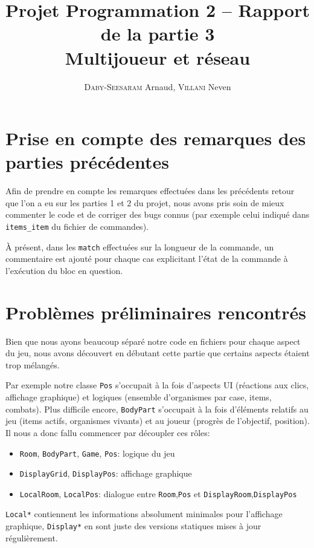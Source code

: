 \documentclass[a4paper,french]{article}
\title{Projet Programmation 2 -- Rapport de la partie 3\\Multijoueur et réseau}
\author{\textsc{Daby-Seesaram} Arnaud, \textsc{Villani} Neven}
\date{}
\newcommand{\ttt}[1]{\texttt{#1}}
\begin{document}
\maketitle

\section{Prise en compte des remarques des parties précédentes}

Afin de prendre en compte les remarques effectuées dans les précédents retour
que l'on a eu sur les parties 1 et 2 du projet, nous avons pris soin de mieux
commenter le code et de corriger des bugs connus (par exemple celui indiqué dans
\texttt{items\_item} du fichier de commandes).

À présent, dans les \texttt{match} effectuées sur la longueur de la commande, un
commentaire est ajouté pour chaque cas explicitant l'état de la commande à
l'exécution du bloc en question.


\section{Problèmes préliminaires rencontrés}

Bien que nous ayons beaucoup séparé notre code en fichiers pour chaque aspect du jeu,
nous avons découvert en débutant cette partie que certains aspects étaient trop
mélangés.

Par exemple notre classe \ttt{Pos} s'occupait à la fois d'aspects UI (réactions aux
clics, affichage graphique) et logiques (ensemble d'organismes par case, items, combats).
Plus difficile encore, \ttt{BodyPart} s'occupait à la fois d'éléments relatifs au
jeu (items actifs, organismes vivants) et au joueur (progrès de l'objectif, position).\\

Il nous a donc fallu commencer par découpler ces rôles:
\begin{itemize}
    \item \ttt{Room}, \ttt{BodyPart}, \ttt{Game}, \ttt{Pos}: logique du jeu
    \item \ttt{DisplayGrid}, \ttt{DisplayPos}: affichage graphique
    \item \ttt{LocalRoom}, \ttt{LocalPos}: dialogue entre \ttt{Room},\ttt{Pos} et \ttt{DisplayRoom},\ttt{DisplayPos}
\end{itemize}

\ttt{Local*} contiennent les informations absolument minimales pour l'affichage graphique, \ttt{Display*} en sont
juste des versions statiques mises à jour régulièrement.\\
\end{document}
